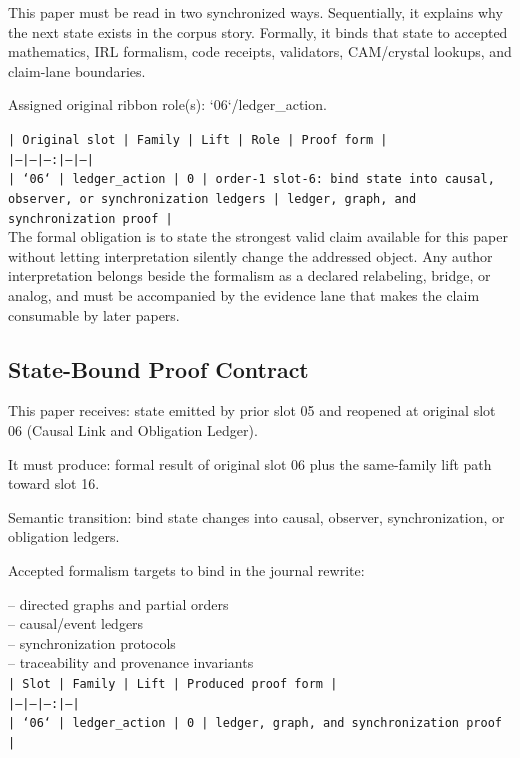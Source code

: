\documentclass[11pt]{article}
\begin{document}
This paper must be read in two synchronized ways. Sequentially, it explains why
the next state exists in the corpus story. Formally, it binds that state to
accepted mathematics, IRL formalism, code receipts, validators, CAM/crystal
lookups, and claim-lane boundaries.

Assigned original ribbon role(s): `06`/ledger\_action.

\noindent\texttt{| Original slot | Family | Lift | Role | Proof form |}\\
\noindent\texttt{|---|---|---:|---|---|}\\
\noindent\texttt{| `06` | ledger\_action | 0 | order-1 slot-6: bind state into causal, observer, or synchronization ledgers | ledger, graph, and synchronization proof |}\\

The formal obligation is to state the strongest valid claim available for this
paper without letting interpretation silently change the addressed object. Any
author interpretation belongs beside the formalism as a declared relabeling,
bridge, or analog, and must be accompanied by the evidence lane that makes the
claim consumable by later papers.

\subsection*{State-Bound Proof Contract}

This paper receives: state emitted by prior slot 05 and reopened at original slot 06 (Causal Link and Obligation Ledger).

It must produce: formal result of original slot 06 plus the same-family lift path toward slot 16.

Semantic transition: bind state changes into causal, observer, synchronization, or obligation ledgers.

Accepted formalism targets to bind in the journal rewrite:

\noindent{}-- directed graphs and partial orders\\
\noindent{}-- causal/event ledgers\\
\noindent{}-- synchronization protocols\\
\noindent{}-- traceability and provenance invariants\\

\noindent\texttt{| Slot | Family | Lift | Produced proof form |}\\
\noindent\texttt{|---|---|---:|---|}\\
\noindent\texttt{| `06` | ledger\_action | 0 | ledger, graph, and synchronization proof |}\\
\end{document}
